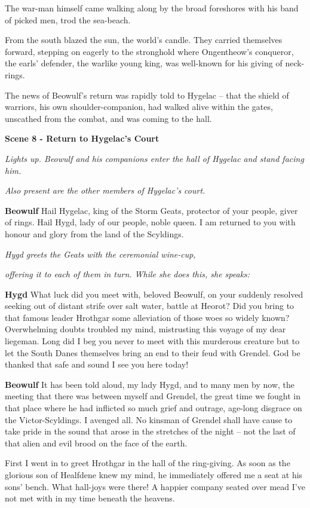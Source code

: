 \documentclass[a4paper]{article}
\begin{document}
{The war-man himself came walking along
by the broad foreshores with his band of picked men,
trod the sea-beach. 

From the south blazed
the sun, the world's candle. They carried themselves forward,
stepping on eagerly to the stronghold where
Ongentheow's conqueror, the earls' defender,
the warlike young king, was well-known for his
giving of neck-rings. 

The news of Beowulf's
return was rapidly told to Hygelac
– that the shield of warriors, his own shoulder-companion,
had walked alive within the gates,
unscathed from the combat, and was coming to the hall.

\newpage
\centerline{\textbf{Scene 8 - Return to Hygelac's Court}}
\centerline{\textit{Lights up. Beowulf and his companions enter the hall of Hygelac and stand facing him.}}
\centerline{\textit{Also present are the other members of Hygelac's court.}}

\textbf{Beowulf} Hail Hygelac,
king of the Storm Geats, 
protector of your people, giver of rings.
Hail Hygd, lady of our people,
noble queen.
I am returned to you with honour and glory
from the land of the Scyldings.

\centerline{\textit{Hygd greets the Geats with the ceremonial wine-cup,}}
\centerline{\textit{offering it to each of them in turn. While she does this, she speaks: }}

\textbf{Hygd} What luck did you meet with, beloved Beowulf,
on your suddenly resolved seeking out
of distant strife over salt water,
battle at Heorot? Did you bring to that famous
leader Hrothgar some alleviation
of those woes so widely known? Overwhelming doubts
troubled my mind, mistrusting this voyage
of my dear liegeman. Long did I beg you
never to meet with this murderous creature
but to let the South Danes themselves bring an end
to their feud with Grendel. God be thanked
that safe and sound I see you here today!

\textbf{Beowulf} It has been told aloud, my lady Hygd,
and to many men by now, the meeting that there was
between myself and Grendel, the great time
we fought in that place where he had inflicted so much
grief and outrage, age-long disgrace
on the Victor-Scyldings. I avenged all.
No kinsman of Grendel shall have cause to take pride
in the sound that arose in the stretches of the night
– not the last of that alien and evil brood
on the face of the earth.

First I went in
to greet Hrothgar in the hall of the ring-giving.
As soon as the glorious son of Healfdene
knew my mind, he immediately
offered me a seat at his sons' bench.
What hall-joys were there! A happier company
seated over mead I've not met with in my time
beneath the heavens. 

}
\end{document}
